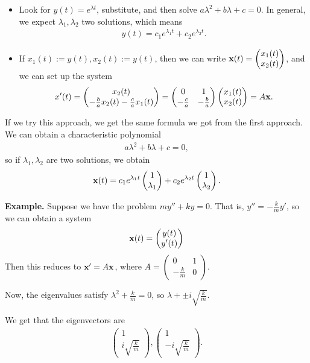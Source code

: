 \documentclass{article}
\newcommand{\mat}[1]{\begin{pmatrix}#1\end{pmatrix}}
\begin{document}
\begin{itemize}
  \item Look for $y(t) = e^{\lambda t}$, substitute, and then solve $a \lambda^2 + b \lambda + c = 0$.  In general, we expect $\lambda_1, \lambda_2$ two solutions, which means
    \begin{align*}
      y(t) = c_1 e^{\lambda_1 t} + c_2 e^{\lambda_2 t}.
    \end{align*}
  \item If $x_1(t) := y(t), x_2(t):= y(t)$, then we can write $\mbf{x}(t) = \mat{x_1(t) \\ x_2(t)}$, and we can set up the system
    \begin{align*}
      x'(t) = \mat{x_2(t) \\ - \frac{b}{a} x_2(t) - \frac{c}{a} x_1(t)} = \mat{0 & 1 \\ - \frac{c}{a} & - \frac{b}{a}} \mat{x_1(t) \\ x_2(t)} = A \mbf{x}.
    \end{align*}
\end{itemize}

If we try this approach, we get the same formula we got from the first approach.  We can obtain a characteristic polynomial
\begin{align*}
  a\lambda^2 + b \lambda + c = 0,
\end{align*}
so if $\lambda_1, \lambda_2$ are two solutions, we obtain
\begin{align*}
  \mbf{x}(t) = c_1 e^{\lambda_1 t} \mat{1 \\ \lambda_1} + c_2 e^{\lambda_2 t} \mat{1 \\ \lambda_2}.
\end{align*}

{\bf Example.} Suppose we have the problem $my'' + ky = 0$.  That is, $y'' = - \frac{k}{m} y'$, so we can obtain a system
\begin{align*}
  \mbf{x}(t) = \mat{y(t) \\ y'(t)}
\end{align*}
Then this reduces to $\mathbf{x}' = A \mathbf{x}$, where $A = \mat{0 & 1 \\ - \frac{k}{m} & 0}$.

Now, the eigenvalues satisfy $\lambda^2 + \frac{k}{m} = 0$, so $\lambda + \pm i \sqrt{\frac{k}{m}}$.

We get that the eigenvectors are 
\begin{align*}
  \mat{1 \\ i \sqrt{\frac{k}{m}}}, \mat{1 \\ -i \sqrt{\frac{k}{m}}}.
\end{align*}
\end{document}
